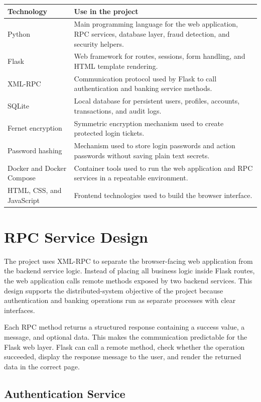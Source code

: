 \documentclass[12pt,a4paper]{article}
\newcommand{\sectionbreakguard}{\Needspace{8\baselineskip}}
\newcommand{\subsectionbreakguard}{\Needspace{5\baselineskip}}
\begin{document}
\begin{longtable}{|p{4cm}|p{10cm}|}
\hline
\textbf{Technology} & \textbf{Use in the project} \\
\hline
Python & Main programming language for the web application, RPC services, database layer, fraud detection, and security helpers. \\
\hline
Flask & Web framework for routes, sessions, form handling, and HTML template rendering. \\
\hline
XML-RPC & Communication protocol used by Flask to call authentication and banking service methods. \\
\hline
SQLite & Local database for persistent users, profiles, accounts, transactions, and audit logs. \\
\hline
Fernet encryption & Symmetric encryption mechanism used to create protected login tickets. \\
\hline
Password hashing & Mechanism used to store login passwords and action passwords without saving plain text secrets. \\
\hline
Docker and Docker Compose & Container tools used to run the web application and RPC services in a repeatable environment. \\
\hline
HTML, CSS, and JavaScript & Frontend technologies used to build the browser interface. \\
\hline
\end{longtable}

\sectionbreakguard
\section{RPC Service Design}

The project uses XML-RPC to separate the browser-facing web application from the backend service logic. Instead of placing all business logic inside Flask routes, the web application calls remote methods exposed by two backend services. This design supports the distributed-system objective of the project because authentication and banking operations run as separate processes with clear interfaces.

Each RPC method returns a structured response containing a success value, a message, and optional data. This makes the communication predictable for the Flask web layer. Flask can call a remote method, check whether the operation succeeded, display the response message to the user, and render the returned data in the correct page.

\subsectionbreakguard
\subsection{Authentication Service}
\end{document}

